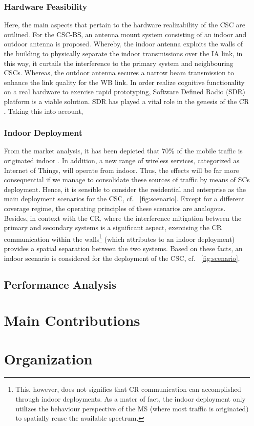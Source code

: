 \subsubsection*{Hardware Feasibility}
Here, the main aspects that pertain to the hardware realizability of the CSC are outlined. For the CSC-BS, an antenna mount system consisting of an indoor and outdoor antenna is proposed. Whereby, the indoor antenna exploits the walls of the building to physically separate the indoor transmissions over the IA link, in this way, it curtails the interference to the primary system and neighbouring CSCs.
Whereas, the outdoor antenna secures a narrow beam transmission to enhance the link quality for the WB link. In order realize cognitive functionality on a real hardware to exercise rapid prototyping, Software Defined Radio (SDR) platform is a viable solution. SDR has played a vital role in the genesis of the CR \cite{Jondral05}. Taking this into account, 



\subsubsection*{Indoor Deployment}
From the market analysis, it has been depicted that $70\%$ of the mobile traffic is originated indoor \cite{Chander08}. In addition, a new range of wireless services, categorized as Internet of Things, will operate from indoor. Thus, the effects will be far more consequential if we manage to consolidate these sources of traffic by means of SCs deployment. Hence, it is sensible to consider the residential and enterprise as the main deployment scenarios for the CSC, cf. \figurename~\ref{fig:scenario}. Except for a different coverage regime, the operating principles of these scenarios are analogous. Besides, in context with the CR, where the interference mitigation between the primary and secondary systems is a significant aspect, exercising the CR communication within the walls\footnote{This, however, does not signifies that CR communication can accomplished through indoor deployments. As a mater of fact, the indoor deployment only utilizes the behaviour perspective of the MS (where most traffic is originated) to spatially reuse the available spectrum.} (which attributes to an indoor deployment) provides a spatial separation between the two systems. Based on these facts, an indoor scenario is considered for the deployment of the CSC, cf. \figurename~\ref{fig:scenario}.  

\subsection{Performance Analysis}

\section{Main Contributions}

\section{Organization}
